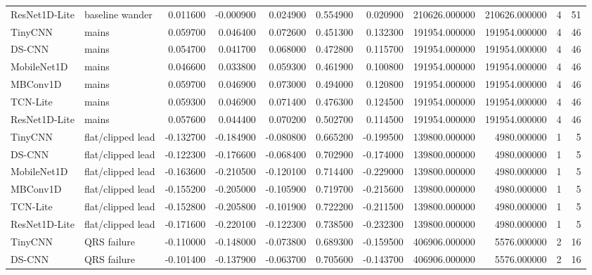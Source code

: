 \begin{table}
\begin{tabular}{llrrrrrrrrr}
\cline{1-11}
ResNet1D-Lite & baseline wander & 0.011600 & -0.000900 & 0.024900 & 0.554900 & 0.020900 & 210626.000000 & 210626.000000 & 4 & 51 \\
\cline{1-11}
TinyCNN & mains & 0.059700 & 0.046400 & 0.072600 & 0.451300 & 0.132300 & 191954.000000 & 191954.000000 & 4 & 46 \\
\cline{1-11}
DS-CNN & mains & 0.054700 & 0.041700 & 0.068000 & 0.472800 & 0.115700 & 191954.000000 & 191954.000000 & 4 & 46 \\
\cline{1-11}
MobileNet1D & mains & 0.046600 & 0.033800 & 0.059300 & 0.461900 & 0.100800 & 191954.000000 & 191954.000000 & 4 & 46 \\
\cline{1-11}
MBConv1D & mains & 0.059700 & 0.046900 & 0.073000 & 0.494000 & 0.120800 & 191954.000000 & 191954.000000 & 4 & 46 \\
\cline{1-11}
TCN-Lite & mains & 0.059300 & 0.046900 & 0.071400 & 0.476300 & 0.124500 & 191954.000000 & 191954.000000 & 4 & 46 \\
\cline{1-11}
ResNet1D-Lite & mains & 0.057600 & 0.044400 & 0.070200 & 0.502700 & 0.114500 & 191954.000000 & 191954.000000 & 4 & 46 \\
\cline{1-11}
TinyCNN & flat/clipped lead & -0.132700 & -0.184900 & -0.080800 & 0.665200 & -0.199500 & 139800.000000 & 4980.000000 & 1 & 5 \\
\cline{1-11}
DS-CNN & flat/clipped lead & -0.122300 & -0.176600 & -0.068400 & 0.702900 & -0.174000 & 139800.000000 & 4980.000000 & 1 & 5 \\
\cline{1-11}
MobileNet1D & flat/clipped lead & -0.163600 & -0.210500 & -0.120100 & 0.714400 & -0.229000 & 139800.000000 & 4980.000000 & 1 & 5 \\
\cline{1-11}
MBConv1D & flat/clipped lead & -0.155200 & -0.205000 & -0.105900 & 0.719700 & -0.215600 & 139800.000000 & 4980.000000 & 1 & 5 \\
\cline{1-11}
TCN-Lite & flat/clipped lead & -0.152800 & -0.205800 & -0.101900 & 0.722200 & -0.211500 & 139800.000000 & 4980.000000 & 1 & 5 \\
\cline{1-11}
ResNet1D-Lite & flat/clipped lead & -0.171600 & -0.220100 & -0.122300 & 0.738500 & -0.232300 & 139800.000000 & 4980.000000 & 1 & 5 \\
\cline{1-11}
TinyCNN & QRS failure & -0.110000 & -0.148000 & -0.073800 & 0.689300 & -0.159500 & 406906.000000 & 5576.000000 & 2 & 16 \\
\cline{1-11}
DS-CNN & QRS failure & -0.101400 & -0.137900 & -0.063700 & 0.705600 & -0.143700 & 406906.000000 & 5576.000000 & 2 & 16 \\

\end{tabular}
\end{table}
